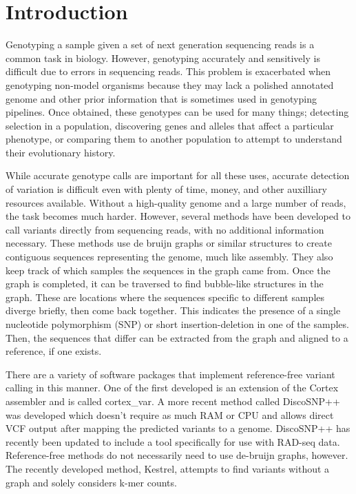 \documentclass{article}
\begin{document}
\section{Introduction}
\begin{outline}
	\item Genotyping a sample given a set of next generation sequencing reads is a common task in biology. However, genotyping accurately and sensitively is difficult due to errors in sequencing reads. This problem is exacerbated when genotyping non-model organisms because they may lack a polished annotated genome and other prior information that is sometimes used in genotyping pipelines. Once obtained, these genotypes can be used for many things; detecting selection in a population, discovering genes and alleles that affect a particular phenotype, or comparing them to another population to attempt to understand their evolutionary history.

	\item While accurate genotype calls are important for all these uses, accurate detection of variation is difficult even with plenty of time, money, and other auxilliary resources available. Without a high-quality genome and a large number of reads, the task becomes much harder. However, several methods have been developed to call variants directly from sequencing reads, with no additional information necessary. These methods use de bruijn graphs or similar structures to create contiguous sequences representing the genome, much like assembly. They also keep track of which samples the sequences in the graph came from. Once the graph is completed, it can be traversed to find bubble-like structures in the graph. These are locations where the sequences specific to different samples diverge briefly, then come back together. This indicates the presence of a single nucleotide polymorphism (SNP) or short insertion-deletion in one of the samples. Then, the sequences that differ can be extracted from the graph and aligned to a reference, if one exists.

	\item There are a variety of software packages that implement reference-free variant calling in this manner. One of the first developed is an extension of the Cortex assembler and is called cortex\_var. A more recent method called DiscoSNP++ was developed which doesn't require as much RAM or CPU and allows direct VCF output after mapping the predicted variants to a genome. DiscoSNP++ has recently been updated to include a tool specifically for use with RAD-seq data. Reference-free methods do not necessarily need to use de-bruijn graphs, however. The recently developed method, Kestrel, attempts to find variants without a graph and solely considers k-mer counts. %


\end{outline}
\end{document}
